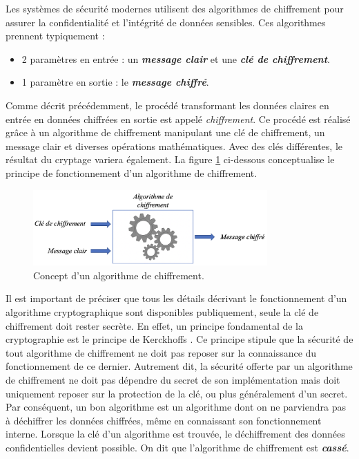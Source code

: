 \documentclass[oneside]{book}
\begin{document}
\hspace{-0.5cm}Les systèmes de sécurité modernes utilisent des algorithmes de chiffrement pour assurer la confidentialité et l'intégrité de données sensibles. Ces algorithmes prennent typiquement : 
\begin{itemize}
\item  2 paramètres en entrée : un \textbf{\textit{message clair}} et une \textbf{\textit{clé de chiffrement}}.
\item 1 paramètre en sortie : le \textbf{\textit{message chiffré}}. \\
\end{itemize}
Comme décrit précédemment, le procédé transformant les données claires en entrée en données chiffrées en sortie est appelé \textit{chiffrement}. Ce procédé est réalisé grâce à un algorithme de chiffrement manipulant une clé de chiffrement, un message clair et diverses opérations mathématiques. Avec des clés différentes, le résultat du cryptage variera également. La figure \ref{fig:chiffrement} ci-dessous conceptualise le principe de fonctionnement d'un algorithme de chiffrement.

\begin{figure}[htbp]
    \centering
    \includegraphics[width=0.8\textwidth]{image/chiffrement}
    \caption{Concept d'un algorithme de chiffrement.}
    \label{fig:chiffrement}
\end{figure}

Il est important de préciser que tous les détails décrivant le fonctionnement d'un algorithme cryptographique sont disponibles publiquement, seule la clé de chiffrement doit rester secrète. En effet, un principe fondamental de la cryptographie est le principe de Kerckhoffs \cite{noauthor_principe_nodate}. Ce principe stipule que la sécurité de tout algorithme de chiffrement ne doit pas reposer sur la connaissance du fonctionnement de ce dernier. Autrement dit, la sécurité offerte par un algorithme de chiffrement ne doit pas dépendre du secret de son implémentation mais doit uniquement reposer sur la protection de la clé, ou plus généralement d'un secret. Par conséquent, un bon algorithme est un algorithme dont on ne parviendra pas à déchiffrer les données chiffrées, même en connaissant son fonctionnement interne. Lorsque la clé d'un algorithme est trouvée, le déchiffrement des données confidentielles devient possible. On dit que l'algorithme de chiffrement est \textbf{\textit{cassé}}.
\end{document}
